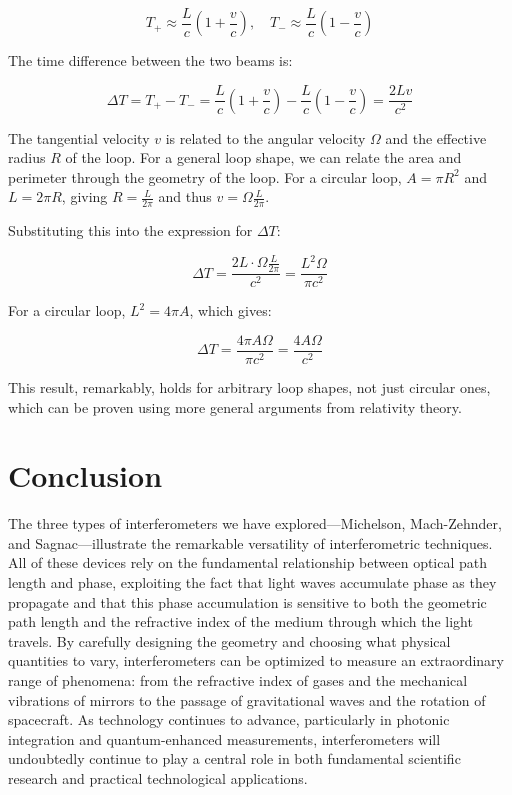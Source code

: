 \documentclass[
  a4paper,
]{book}
\begin{document}
\begin{tcolorbox}
\[
T_+ \approx \frac{L}{c}\left(1 + \frac{v}{c}\right), \quad T_- \approx \frac{L}{c}\left(1 - \frac{v}{c}\right)
\]

The time difference between the two beams is:

\[
\Delta T = T_+ - T_- = \frac{L}{c}\left(1 + \frac{v}{c}\right) - \frac{L}{c}\left(1 - \frac{v}{c}\right) = \frac{2Lv}{c^2}
\]

The tangential velocity \(v\) is related to the angular velocity
\(\Omega\) and the effective radius \(R\) of the loop. For a general
loop shape, we can relate the area and perimeter through the geometry of
the loop. For a circular loop, \(A = \pi R^2\) and \(L = 2\pi R\),
giving \(R = \frac{L}{2\pi}\) and thus \(v = \Omega \frac{L}{2\pi}\).

Substituting this into the expression for \(\Delta T\):

\[
\Delta T = \frac{2L \cdot \Omega \frac{L}{2\pi}}{c^2} = \frac{L^2 \Omega}{\pi c^2}
\]

For a circular loop, \(L^2 = 4\pi A\), which gives:

\[
\Delta T = \frac{4\pi A \Omega}{\pi c^2} = \frac{4A\Omega}{c^2}
\]

This result, remarkably, holds for arbitrary loop shapes, not just
circular ones, which can be proven using more general arguments from
relativity theory.

\end{tcolorbox}

\section{Conclusion}\label{conclusion-2}

The three types of interferometers we have explored---Michelson,
Mach-Zehnder, and Sagnac---illustrate the remarkable versatility of
interferometric techniques. All of these devices rely on the fundamental
relationship between optical path length and phase, exploiting the fact
that light waves accumulate phase as they propagate and that this phase
accumulation is sensitive to both the geometric path length and the
refractive index of the medium through which the light travels. By
carefully designing the geometry and choosing what physical quantities
to vary, interferometers can be optimized to measure an extraordinary
range of phenomena: from the refractive index of gases and the
mechanical vibrations of mirrors to the passage of gravitational waves
and the rotation of spacecraft. As technology continues to advance,
particularly in photonic integration and quantum-enhanced measurements,
interferometers will undoubtedly continue to play a central role in both
fundamental scientific research and practical technological
applications.
\end{document}
